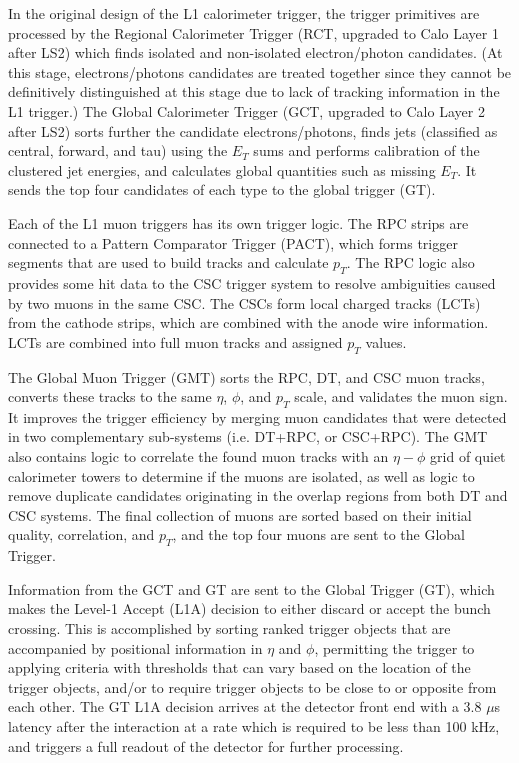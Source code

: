 \documentclass{article}
\begin{document}
In the original design of the L1 calorimeter trigger, the trigger primitives are processed by the Regional Calorimeter Trigger (RCT, upgraded to Calo Layer 1 after LS2) which finds isolated and non-isolated electron/photon candidates. (At this stage, electrons/photons candidates are treated together since they cannot be definitively distinguished at this stage due to lack of tracking information in the L1 trigger.) The Global Calorimeter Trigger (GCT, upgraded to Calo Layer 2 after LS2) sorts further the candidate electrons/photons, finds jets (classified as central, forward, and tau) using the $E_T$ sums and performs calibration of the clustered jet energies, and calculates global quantities such as missing $E_T$. It sends the top four candidates of each type to the global trigger (GT).

Each of the L1 muon triggers has its own trigger logic. The RPC strips are connected to a Pattern Comparator Trigger (PACT), which forms trigger segments that are used to build tracks and calculate $p_{T}$. The RPC logic also provides some hit data to the CSC trigger system to resolve ambiguities caused by two muons in the same CSC. The CSCs form local charged tracks (LCTs) from the cathode strips, which are combined with the anode wire information. LCTs are combined into full muon tracks and assigned $p_{T}$ values. 

The Global Muon Trigger (GMT) sorts the RPC, DT, and CSC muon tracks, converts these tracks to the same $\eta$, $\phi$, and $p_{T}$ scale, and validates the muon sign. It improves the trigger efficiency by merging muon candidates that were detected in two complementary sub-systems (i.e. DT+RPC, or CSC+RPC). The GMT also contains logic to correlate the found muon tracks with an $\eta-\phi$ grid of quiet calorimeter towers to determine if the muons are isolated, as well as logic to remove duplicate candidates originating in the overlap regions from both DT and CSC systems. The final collection of muons are sorted based on their initial quality, correlation, and $p_{T}$, and the top four muons are sent to the Global Trigger. 

Information from the GCT and GT are sent to the Global Trigger (GT), which makes the Level-1 Accept (L1A) decision to either discard or accept the bunch crossing. This is accomplished by sorting ranked trigger objects that are accompanied by positional information in $\eta$ and $\phi$, permitting the trigger to applying criteria with thresholds that can vary based on the location of the trigger objects, and/or to require trigger objects to be close to or opposite from each other. The GT L1A decision arrives at the detector front end with a 3.8 $\mu$s latency after the interaction at a rate which is required to be less than 100 kHz, and triggers a full readout of the detector for further processing.
\end{document}
